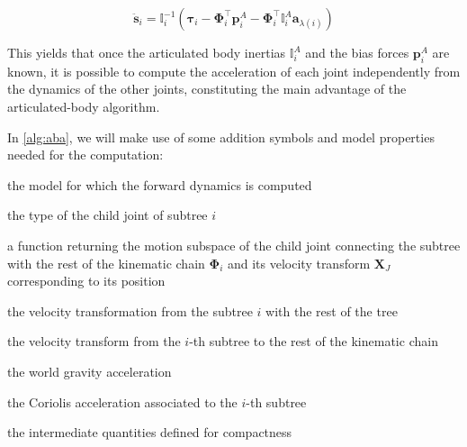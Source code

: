 \begin{equation}
    \ddot{\mathbf{s}} _i = \mathbb{I} _i ^{-1} (\boldsymbol{\tau} _i - \boldsymbol{\Phi} ^\top _i \mathbf{p} ^A _i - \boldsymbol{\Phi} ^\top _i \mathbb{I} _i ^A \mathbf{a} _{\lambda(i)})
\end{equation}

This yields that once the articulated body inertias $\mathbb{I} _i ^A$ and the bias forces $\mathbf{p}_i ^A$ are known, it is possible to compute the acceleration of each joint independently from the dynamics of the other joints, constituting the main advantage of the articulated-body algorithm.

In \cref{alg:aba}, we will make use of some addition symbols and model properties needed for the computation:

\begin{description}
    \begin{description}[leftmargin=!,labelwidth=\widthof{${}^i\mathbf{X}_{\lambda(i)} = {}^{\lambda(i)}\mathbf{X}_{i}^\top$}]
        \item[$\mathcal{M}$] the model for which the forward dynamics is computed
        \item[$\text{jtype}(i)$] the type of the child joint of subtree $i$
        \item[$\text{jcalc}(\cdot)$] a function returning the motion subspace of the child joint connecting the subtree with the rest of the kinematic chain $\boldsymbol{\Phi}_i$ and its velocity transform $\mathbf{X}_J$ corresponding to its position
        \item[$\textbf{X}_T(i)$] the velocity transformation from the subtree $i$ with the rest of the tree
        \item[${}^i\mathbf{X}_{\lambda(i)} = {}^{\lambda(i)}\mathbf{X}_{i}^\top$] the velocity transform from the $i$-th subtree to the rest of the kinematic chain
        \item[$\mathbf{a}_g$] the world gravity acceleration
        \item[$\mathbf{c}_i$] the Coriolis acceleration associated to the $i$-th subtree
        \item[$\mathbf{U}_i , \mathbf{D}_i, \mathbf{u}_i$] the intermediate quantities defined for compactness
    \end{description}
\end{description}

